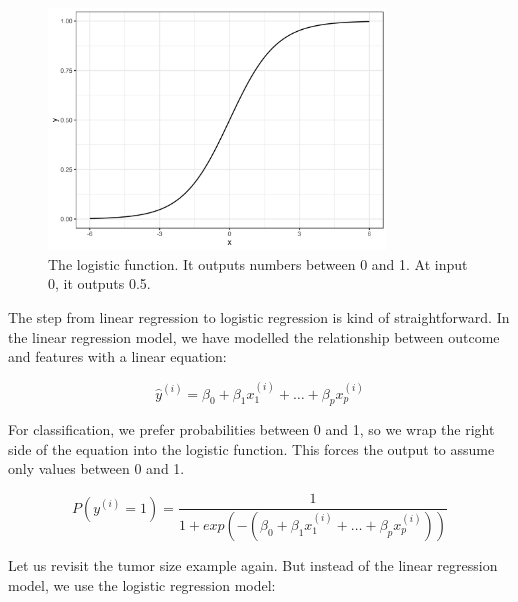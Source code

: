 \documentclass[
  11pt,
]{scrbook}
\begin{document}
\begin{figure}

{\centering \includegraphics[width=0.8\textwidth]{images/logistic-function-1} 

}

\caption{The logistic function. It outputs numbers between 0 and 1. At input 0, it outputs 0.5.}\label{fig:logistic-function}
\end{figure}

The step from linear regression to logistic regression is kind of straightforward.
In the linear regression model, we have modelled the relationship between outcome and features with a linear equation:

\[\hat{y}^{(i)}=\beta_{0}+\beta_{1}x^{(i)}_{1}+\ldots+\beta_{p}x^{(i)}_{p}\]

For classification, we prefer probabilities between 0 and 1, so we wrap the right side of the equation into the logistic function.
This forces the output to assume only values between 0 and 1.

\[P(y^{(i)}=1)=\frac{1}{1+exp(-(\beta_{0}+\beta_{1}x^{(i)}_{1}+\ldots+\beta_{p}x^{(i)}_{p}))}\]

Let us revisit the tumor size example again.
But instead of the linear regression model, we use the logistic regression model:
\end{document}
